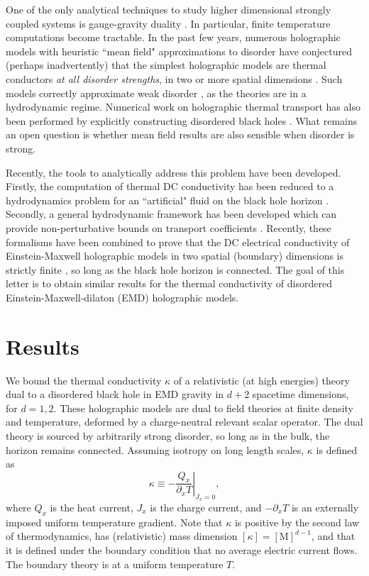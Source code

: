 \documentclass[10pt, oneside]{book}
\begin{document}
\begin{doublespace}
One of the only analytical techniques to study higher dimensional strongly coupled systems is gauge-gravity duality \cite{Hartnoll:2009sz, McGreevy:2009xe, Sachdev:2011wg}.  In particular, finite temperature computations become tractable.   In the past few years, numerous holographic models with heuristic ``mean field" approximations to disorder have conjectured (perhaps inadvertently) that the simplest holographic models are thermal conductors \emph{at all disorder strengths}, in two or more spatial dimensions \cite{Amoretti:2014zha, Amoretti:2014mma, Donos:2014cya, Davison:2014lua}.  Such models correctly approximate weak disorder \cite{Blake:2013owa, lucas1401, Lucas:2015vna}, as the theories are in a hydrodynamic regime.   Numerical work on holographic thermal transport \cite{Donos:2014yya, Rangamani:2015hka, Hartnoll:2015rza} has also been performed by explicitly constructing disordered black holes \cite{Hartnoll:2014cua, Hartnoll:2015faa}.  What remains an open question is whether mean field results are also sensible when disorder is strong.    

Recently, the tools to analytically address this problem have been developed.   Firstly, the computation of thermal DC conductivity has been reduced to a hydrodynamics problem for an ``artificial" fluid on the black hole horizon \cite{Donos:2015gia, Banks:2015wha}.  Secondly, a general hydrodynamic framework has been developed which can provide non-perturbative bounds on transport coefficients \cite{Lucas:2015lna}.  Recently, these formalisms have been combined to prove that the DC electrical conductivity of Einstein-Maxwell holographic models in two spatial (boundary) dimensions is strictly finite \cite{Grozdanov:2015qia}, so long as the black hole horizon is connected.   The goal of this letter is to obtain similar results for the thermal conductivity of disordered Einstein-Maxwell-dilaton (EMD) holographic models.

\section{Results}
We bound the thermal conductivity $\kappa$ of a relativistic (at high energies) theory dual to a disordered black hole in EMD gravity in $d+2$ spacetime dimensions, for $d=1,2$.   These holographic models are dual to field theories at finite density and temperature, deformed by a charge-neutral relevant scalar operator.   The dual theory is sourced by arbitrarily strong disorder, so long as in the bulk, the horizon remains connected. Assuming isotropy on long length scales, $\kappa$ is defined as 
\begin{equation}
\kappa \equiv \left.- \frac{Q_x}{ \partial_x T}\right|_{J_x=0},   \label{kappaeq}
\end{equation}
where $Q_x$ is the heat current, $J_x$ is the charge current, and $-\partial_x T$ is an externally imposed uniform temperature gradient.  Note that $\kappa$ is positive by the second law of thermodynamics, has (relativistic) mass dimension $[\kappa]=[\mathrm{M}]^{d-1}$, and that it is defined under the boundary condition that no average electric current flows.  The boundary theory is at a uniform temperature $T$.


\end{doublespace}
\end{document}
